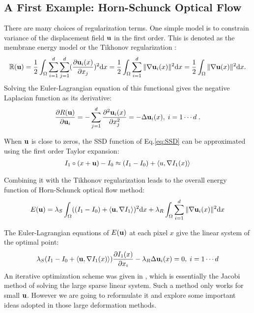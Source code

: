 \documentclass[letterpaper,12pt]{article}
\begin{document}
\subsection{A First Example: Horn-Schunck Optical Flow}
\label{sec:opticalflow}
There are many choices of regularization terms. One simple model is to constrain variance of the displacement field $\mathbf{u}$ in the first order. This is denoted as the membrane energy model \cite{Ashburner2007} or the Tikhonov regularization \cite{Horn1981}:
\begin{align}
\label{eq:membrane}
\mathbb{R}(\mathbf{u}) = \frac{1}{2} \int_\Omega \sum_{i=1}^d\sum_{j=1}^d (\frac{\partial \mathbf{u}_i(x)}{\partial x_j})^2 \text{d} x
= \frac{1}{2} \int_\Omega \sum_{i=1}^d \| \nabla \mathbf{u}_i(x) \|^2 \text{d} x = \frac{1}{2} \int_\Omega \| \nabla\mathbf{u}(x)\|^2 \text{d} x.
\end{align}
Solving the Euler-Lagrangian equation of this functional gives the negative Laplacian function as its derivative:
\begin{align}
\label{eq:membraneEL}
\frac{\partial R(\mathbf{u})}{\partial \mathbf{u}_i} = -  \sum_{j=1}^d \frac{\partial^2 \mathbf{u}_i(x)}{\partial x_j^2} 
= -  \Delta \mathbf{u}_i(x) 
, \; i=1 \cdots d \;.
\end{align}

When $\mathbf{u}$ is close to zeros, the SSD function of Eq.\ref{eq:SSD} can be approximated using the first order Taylor expansion:
\begin{align}
I_1 \circ (x + \mathbf{u} ) - I_0 \approx (I_1 - I_0 ) + \langle u, \nabla I_1(x) \rangle
\label{eq:approxopticalflow}
\end{align}

Combining it with the Tikhonov regularization leads to the overall energy function of Horn-Schunck optical flow method: 
\begin{align}
E(\mathbf{u}) = \lambda_S \int_\Omega ((I_1 - I_0 ) + \langle \mathbf{u}, \nabla I_1 \rangle)^2 \text{d} x
+ \lambda_R \int_\Omega \sum_{i=1}^d \| \nabla \mathbf{u}_i(x) \|^2 \text{d} x
\end{align}

The Euler-Lagrangian equations of $E(\mathbf{u})$ at each pixel $x$ give the linear system of the optimal point:
\begin{align}
\lambda_S (I_1 - I_0  + \langle \mathbf{u}, \nabla I_1(x) \rangle) \frac{\partial I_1(x)}{\partial x_i}
- \lambda_R \Delta \mathbf{u}_i(x) = 0
, \; i=1 \cdots d
\label{eq:opticalflow}
\end{align}
An iterative optimization scheme was given in \cite{Horn1981}, which is essentially the Jacobi method of solving the large sparse linear system. Such a method only works for small $\mathbf{u}$. However we are going to reformulate it and explore some important ideas adopted in those large deformation methods. 
\end{document}
